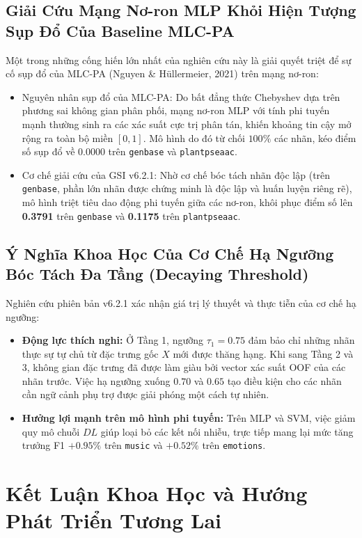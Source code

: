 \documentclass[10pt,a4paper,twoside]{article}
\begin{document}
\subsection{Giải Cứu Mạng Nơ-ron MLP Khỏi Hiện Tượng Sụp Đổ Của Baseline MLC-PA}
Một trong những cống hiến lớn nhất của nghiên cứu này là giải quyết triệt để sự cố sụp đổ của MLC-PA (Nguyen \& Hüllermeier, 2021) trên mạng nơ-ron:
\begin{itemize}[leftmargin=*]
    \item Nguyên nhân sụp đổ của MLC-PA: Do bất đẳng thức Chebyshev dựa trên phương sai không gian phân phối, mạng nơ-ron MLP với tính phi tuyến mạnh thường sinh ra các xác suất cực trị phân tán, khiến khoảng tin cậy mở rộng ra toàn bộ miền $[0, 1]$. Mô hình do đó từ chối $100\%$ các nhãn, kéo điểm số sụp đổ về $0.0000$ trên \texttt{genbase} và \texttt{plantpseaac}.
    \item Cơ chế giải cứu của GSI v6.2.1: Nhờ cơ chế bóc tách nhãn độc lập (trên \texttt{genbase}, phần lớn nhãn được chứng minh là độc lập và huấn luyện riêng rẽ), mô hình triệt tiêu dao động phi tuyến giữa các nơ-ron, khôi phục điểm số lên \textbf{0.3791} trên \texttt{genbase} và \textbf{0.1175} trên \texttt{plantpseaac}.
\end{itemize}

\subsection{Ý Nghĩa Khoa Học Của Cơ Chế Hạ Ngưỡng Bóc Tách Đa Tầng (Decaying Threshold)}
Nghiên cứu phiên bản v6.2.1 xác nhận giá trị lý thuyết và thực tiễn của cơ chế hạ ngưỡng:
\begin{itemize}[leftmargin=*]
    \item \textbf{Động lực thích nghi:} Ở Tầng 1, ngưỡng $\tau_1 = 0.75$ đảm bảo chỉ những nhãn thực sự tự chủ từ đặc trưng gốc $X$ mới được thăng hạng. Khi sang Tầng 2 và 3, không gian đặc trưng đã được làm giàu bởi vector xác suất OOF của các nhãn trước. Việc hạ ngưỡng xuống $0.70$ và $0.65$ tạo điều kiện cho các nhãn cần ngữ cảnh phụ trợ được giải phóng một cách tự nhiên.
    \item \textbf{Hưởng lợi mạnh trên mô hình phi tuyến:} Trên MLP và SVM, việc giảm quy mô chuỗi $DL$ giúp loại bỏ các kết nối nhiễu, trực tiếp mang lại mức tăng trưởng F1 $+0.95\%$ trên \texttt{music} và $+0.52\%$ trên \texttt{emotions}.
\end{itemize}

\section{Kết Luận Khoa Học và Hướng Phát Triển Tương Lai}
\end{document}
